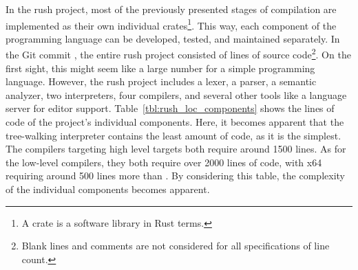 In the rush project, most of the previously presented stages of compilation are implemented as their own individual crates\footnote{A crate is a software library in Rust terms.}.
This way, each component of the programming language can be developed, tested, and maintained separately.
In the Git commit \rushCommit{}, the entire rush project consisted of
 lines of source code\footnote{Blank lines and comments are not considered for all specifications of line count.}.
On the first sight, this might seem like a large number for a simple programming language.
However, the rush project includes a lexer, a parser, a semantic analyzer, two interpreters, four compilers, and several other tools like a language server for editor support.
Table~\ref{tbl:rush_loc_components} shows the lines of code of the project's individual components.
Here, it becomes apparent that the tree-walking interpreter contains the least amount of code, as it is the simplest.
The compilers targeting high level targets both require around 1500 lines.
As for the low-level compilers, they both require over 2000 lines of code, with x64 requiring around 500 lines more than \riscv{}.
By considering this table, the complexity of the individual components becomes apparent.
